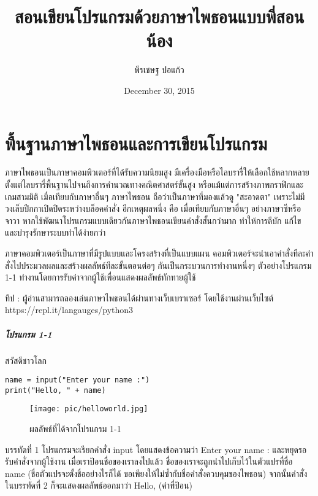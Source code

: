 \documentclass[17pt,fancychapters]{report}
\title{สอนเขียนโปรแกรมด้วยภาษาไพธอนแบบพี่สอนน้อง}
\author{พีรเชษฐ  ปอแก้ว}
\date{December 30, 2015}
\begin{document}
\maketitle
{}
\newpage
{}
\tableofcontents
\newpage
{}

\chapter{พื้นฐานภาษาไพธอนและการเขียนโปรแกรม}

\quad ภาษาไพธอนเป็นภาษาคอมพิวเตอร์ที่ได้รับความนิยมสูง มีเครื่องมือหรือไลบรารี่ให้เลือกใช้หลากหลาย ตั้งแต่ไลบรารี่พื้นฐานไปจนถึงการคำนวณทางคณิตศาสตร์ขั้นสูง หรือแม้แต่การสร้างภาพกราฟิกและเกมสามมิติ เมื่อเทียบกับภาษาอื่นๆ ภาษาไพธอน ถือว่าเป็นภาษาที่มองแล้วดู "สะอาดตา" เพราะไม่มีวงเล็บปีกกาเปิดปิดระหว่างบล็อคคำสั่ง อีกเหตุผลหนึ่ง คือ เมื่อเทียบกับภาษาอื่นๆ อย่างภาษาซีหรือจาวา หากใช้พัฒนาโปรแกรมแบบเดียวกันภาษาไพธอนเขียนคำสั่งสั้นกว่ามาก ทำให้การดีบัก แก้ไข และบำรุงรักษาระบบทำได้ง่ายกว่า

ภาษาคอมพิวเตอร์เป็นภาษาที่มีรูปแบบและโครงสร้างที่เป็นแบบแผน คอมพิวเตอร์จะนำเอาคำสั่งทีละคำสั่งไปประมวลผลและสร้างผลลัพธ์ทีละขั้นตอนต่อๆ กันเป็นกระบวนการทำงานหนึ่งๆ ตัวอย่างโปรแกรม 1-1 ทำงานโดยการรับค่าจากผู้ใช้เพื่อนแสดงผลลัพธ์ทักทายผู้ใช้ 

ทิป : ผู้อ่านสามารถลองเล่นภาษาไพธอนได้ผ่านทางเว็บเบราเซอร์ โดยใช้งานผ่านเว็บไซต์ https://repl.it/langauges/python3

\paragraph{โปรแกรม 1-1} สวัสดีชาวโลก

\begin{lstlisting}[style=python]
name = input("Enter your name :")
print("Hello, " + name)
\end{lstlisting}

\begin{figure}[h!]
	\center
	\texttt{[image: pic/helloworld.jpg]}
	\caption{ผลลัพธ์ที่ได้จากโปรแกรม 1-1}
	\label{fig:example}
\end{figure}

บรรทัดที่ 1 โปรแกรมจะเรียกคำสั่ง input โดยแสดงข้อความว่า Enter your name : และหยุดรอรับคำสั่งจากผู้ใช้งาน เมื่อเราป้อนชื่อของเราลงไปแล้ว ชื่อของเราจะถูกนำไปเก็บไว้ในตัวแปรที่ชื่อ name (ชื่อตัวแปรจะตั้งชื่ออย่างไรก็ได้ ขอเพียงให้ไม่ซ้ำกับชื่อคำสั่งควบคุมของไพธอน) จากนั้นคำสั่งในบรรทัดที่ 2 ก็จะแสดงผลลัพธ์ออกมาว่า Hello, (ค่าที่ป้อน)
\end{document}
